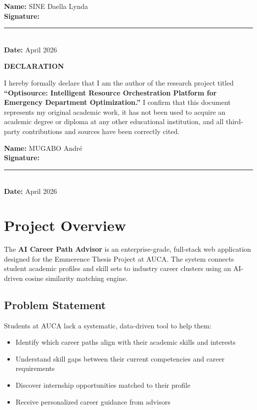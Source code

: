 \documentclass[12pt, a4paper]{article}
\begin{document}
\noindent \textbf{Name:} SINE Daella Lynda\\[1cm]
\noindent \textbf{Signature:} \rule{6cm}{0.4pt}\\[1cm]
\noindent \textbf{Date:} April 2026
\newpage

\vspace*{2cm}
\begin{center}
    \Large\bfseries\color{primary} DECLARATION
\end{center}
\vspace{1.5cm}
I hereby formally declare that I am the author of the research project titled \textbf{``Optisource: Intelligent Resource Orchestration Platform for Emergency Department Optimization.''} I confirm that this document represents my original academic work, it has not been used to acquire an academic degree or diploma at any other educational institution, and all third-party contributions and sources have been correctly cited.
\vspace{2cm}

\noindent \textbf{Name:} MUGABO André\\[1cm]
\noindent \textbf{Signature:} \rule{6cm}{0.4pt}\\[1cm]
\noindent \textbf{Date:} April 2026
\newpage

\tableofcontents
\newpage

\section{Project Overview}

The \textbf{AI Career Path Advisor} is an enterprise-grade, full-stack web application designed for the Emmerence Thesis Project at AUCA. The system connects student academic profiles and skill sets to industry career clusters using an AI-driven cosine similarity matching engine.

\subsection{Problem Statement}

Students at AUCA lack a systematic, data-driven tool to help them:
\begin{itemize}
    \item Identify which career paths align with their academic skills and interests
    \item Understand skill gaps between their current competencies and career requirements
    \item Discover internship opportunities matched to their profile
    \item Receive personalized career guidance from advisors
\end{itemize}
\end{document}
